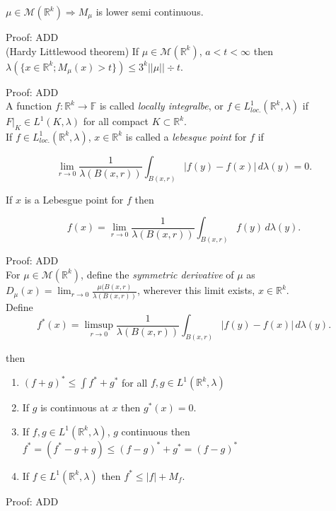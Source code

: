 \documentclass[12pt]{article}
\newcommand{\reals}[0] { \mathbb{R}}
\newcommand{\M}[0] { \mathcal{M} }
\newcommand{\rimply}[0] { \Rightarrow }
\newcommand{\rarw}[0] { \rightarrow }
\begin{document}
$\mu \in \M(\reals^k) \rimply M_\mu$ is lower semi continuous.

\noindent
Proof: ADD \\

(Hardy Littlewood theorem) If $\mu \in \M(\reals^k)$, $a < t < \infty$ then $\lambda(\{ x \in \reals^k; M_\mu(x) > t \} ) \le 3^k ||\mu|| \div t$.

\noindent
Proof: ADD \\

A function $f : \reals^k \rarw \mathbb{F}$ is called \emph{locally integralbe}, or $f \in L^1_{loc.}(\reals^k, \lambda)$ if $F|_K \in L^1(K, \lambda)$ for all compact $K \subset \reals^k$.  \\

If $f \in L^1_{loc.}(\reals^k, \lambda)$, $x \in \reals^k$ is called a \emph{lebesque point} for $f$ if

$$
\lim_{r \rarw 0} \frac{1}{ \lambda(B(x,r))} \int_{B(x,r)} |f(y)-f(x)| \, d \lambda(y) = 0.
$$

\noindent
If $x$ is a Lebesgue point for $f$ then

$$
f(x) = \lim_{r \rarw 0} \frac{1}{ \lambda(B(x,r))} \int_{B(x,r)} f(y) \, d \lambda(y).
$$


\noindent
Proof: ADD \\




For $\mu \in \M(\reals^k)$, define the \emph{symmetric derivative} of $\mu$ as $D_\mu(x) = \lim_{r \rarw 0} \frac{\mu(B(x,r)}{\lambda(B(x,r))}$, wherever this limit exists, $x \in \reals^k$. \\



Define 
$$
    f^*(x) = \limsup_{r \rarw 0} \frac{1}{ \lambda(B(x,r))} \int_{B(x,r)} |f(y)-f(x)| \, d \lambda(y) .
$$

\noindent
then
\begin{enumerate}[1)]
\item
$(f+g)^* \le \int f^* + g^*$ for all $f,g \in L^1(\reals^k, \lambda)$
\item 
If $g$ is continuous at $x$ then $g^*(x) = 0$.
\item
If $f,g \in L^1(\reals^k, \lambda)$, $g$ continuous then $f^* = (f^* - g + g) \le (f-g)^* + g^* = (f-g)^*$
\item
If $f \in L^1(\reals^k, \lambda)$ then $f^* \le |f| + M_f$.
\end{enumerate} 


\noindent
Proof: ADD \\
\end{document}
